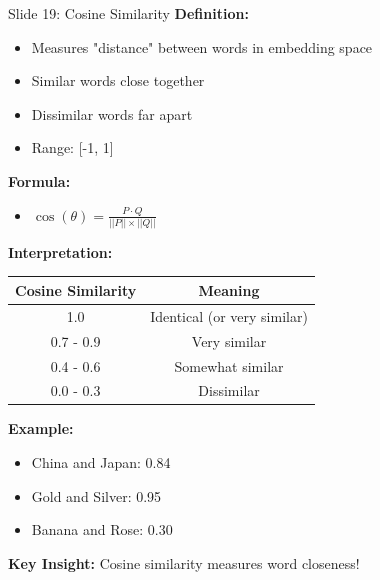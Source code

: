 \documentclass[8pt]{beamer}
\begin{document}
	\begin{frame}{Slide 19: Cosine Similarity}
		\fontsize{6.5}{7.5}\selectfont
		\textbf{Definition:}
		\begin{itemize}
			\item Measures "distance" between words in embedding space
			\item Similar words close together
			\item Dissimilar words far apart
			\item Range: [-1, 1]
		\end{itemize}
		
		\vspace{0.1cm}
		\textbf{Formula:}
		\begin{itemize}
			\item $\cos(\theta) = \frac{P \cdot Q}{||P|| \times ||Q||}$
		\end{itemize}
		
		\vspace{0.1cm}
		\textbf{Interpretation:}
		\begin{tabular}{|c|c|}
			\hline
			\textbf{Cosine Similarity} & \textbf{Meaning} \\
			\hline
			1.0 & Identical (or very similar) \\
			0.7 - 0.9 & Very similar \\
			0.4 - 0.6 & Somewhat similar \\
			0.0 - 0.3 & Dissimilar \\
			\hline
		\end{tabular}
		
		\vspace{0.1cm}
		\textbf{Example:}
		\begin{itemize}
			\item China and Japan: 0.84
			\item Gold and Silver: 0.95
			\item Banana and Rose: 0.30
		\end{itemize}
		
		\textcolor{myblue}{\textbf{Key Insight:}} Cosine similarity measures word closeness!
	\end{frame}
	
\end{document}

